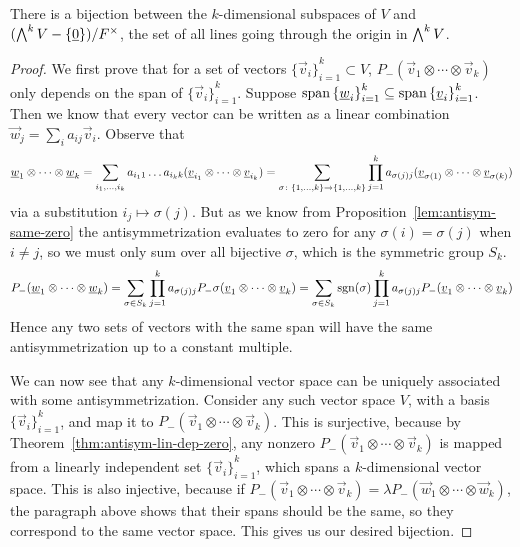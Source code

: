\begin{proposition}
    There is a bijection between the \(k\)-dimensional subspaces of \(V\)
    and \((\operatorname{{\bigwedge}}^k V - \{\underline{0}\})/F^\times\),
    the set of all lines going through the origin in \(\operatorname{{\bigwedge}}^k V\).
\end{proposition}
\begin{proof}
    We first prove that for a set of vectors \({\{\vec{v}_i\}}_{i=1}^k \subset V\),
    \(P_-(\vec{v}_1 \otimes \cdots \otimes \vec{v}_k)\)
    only depends on the span of \({\{\vec{v}_i\}}_{i=1}^k\).
    Suppose \(\operatorname{span}{\{\underline{w}_i\}}_{i=1}^k \subseteq \operatorname{span}{\{\underline{v}_i\}}_{i=1}^k\).
    Then we know that every vector can be written as a linear combination
    \(\vec{w}_j = \sum_i a_{ij}\vec{v}_i\).
    Observe that
    \begin{equation*}
        \underline{w}_1 \otimes \cdots \otimes \underline{w}_k
        = \sum_{i_1,\hdots,i_k} a_{i_1 1} \hdots a_{i_k k}
        (\underline{v}_{i_1} \otimes \cdots \otimes \underline{v}_{i_k})
        = \sum_{\sigma\colon\{1,\hdots,k\}\to\{1,\hdots,k\}}
        \prod_{j=1}^k a_{\sigma(j)j} (\underline{v}_{\sigma(1)} \otimes \cdots \otimes \underline{v}_{\sigma(k)})
    \end{equation*}
    via a substitution \(i_j \mapsto \sigma(j)\).
    But as we know from Proposition~\ref{lem:antisym-same-zero}
    the antisymmetrization evaluates to zero for any \(\sigma(i) = \sigma(j)\) when \(i \neq j\),
    so we must only sum over all bijective \(\sigma\),
    which is the symmetric group \(S_k\).
    \begin{equation*}
        P_-(\underline{w}_1 \otimes \cdots \otimes \underline{w}_k)
        = \sum_{\sigma \in S_k} \prod_{j=1}^k a_{\sigma(j)j}
        P_-\sigma(\underline{v}_1 \otimes \cdots \otimes \underline{v}_k)
        = \sum_{\sigma \in S_k} \operatorname{sgn}(\sigma) \prod_{j=1}^k a_{\sigma(j)j}
        P_-(\underline{v}_1 \otimes \cdots \otimes \underline{v}_k)
    \end{equation*}
    Hence any two sets of vectors with the same span
    will have the same antisymmetrization up to a constant multiple.

    We can now see that any \(k\)-dimensional vector space
    can be uniquely associated with some antisymmetrization.
    Consider any such vector space \(V\),
    with a basis \({\{\vec{v}_i\}}_{i=1}^k\),
    and map it to \(P_-(\vec{v}_1 \otimes \cdots \otimes \vec{v}_k)\).
    This is surjective, because by Theorem~\ref{thm:antisym-lin-dep-zero},
    any nonzero \(P_-(\vec{v}_1 \otimes \cdots \otimes \vec{v}_k)\)
    is mapped from a linearly independent set \({\{\vec{v}_i\}}_{i=1}^k\),
    which spans a \(k\)-dimensional vector space.
    This is also injective, because if
    \(P_-(\vec{v}_1 \otimes \cdots \otimes \vec{v}_k) = \lambda P_-(\vec{w}_1 \otimes \cdots \otimes \vec{w}_k)\),
    the paragraph above shows that their spans should be the same,
    so they correspond to the same vector space.
    This gives us our desired bijection.
\end{proof}
